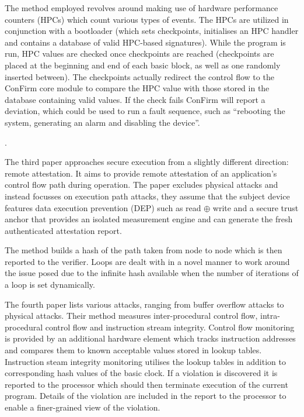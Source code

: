 The method employed revolves around making use of hardware performance counters (HPCs) which count various types of events. The HPCs are utilized in conjunction with a bootloader (which sets checkpoints, initialises an HPC handler and contains a database of valid HPC-based signatures). While the program is run, HPC values are checked once checkpoints are reached (checkpoints are placed at the beginning and end of each basic block, as well as one randomly inserted between). The checkpoints actually redirect the control flow to the ConFirm core module to compare the HPC value with those stored in the database containing valid values. If the check fails ConFirm will report a deviation, which could be used to run a fault sequence, such as ``rebooting the system, generating an alarm and disabling the device''.

\ifnotesincluded
{}.
\fi

The third paper \cite{Abera2016} approaches secure execution from a slightly different direction: remote attestation. It aims to provide remote attestation of an application's control flow path during operation. The paper excludes physical attacks and instead focusses on execution path attacks, they assume that the subject device features data execution prevention (DEP) such as read $\oplus$ write and a secure trust anchor that provides an isolated measurement engine and can generate the fresh authenticated attestation report.

The method builds a hash of the path taken from node to node which is then reported to the verifier. Loops are dealt with in a novel manner to work around the issue posed due to the infinite hash available when the number of iterations of a loop is set dynamically.

\ifnotesincluded
{}
\fi

The fourth paper \cite{Arora2006} lists various attacks, ranging from buffer overflow attacks to physical attacks. Their method measures inter-procedural control flow, intra-procedural control flow and instruction stream integrity. Control flow monitoring is provided by an additional hardware element which tracks instruction addresses and compares them to known acceptable values stored in lookup tables. Instruction steam integrity monitoring utilises the lookup tables in addition to corresponding hash values of the basic clock. If a violation is discovered it is reported to the processor which should then terminate execution of the current program. Details of the violation are included in the report to the processor to enable a finer-grained view of the violation.

